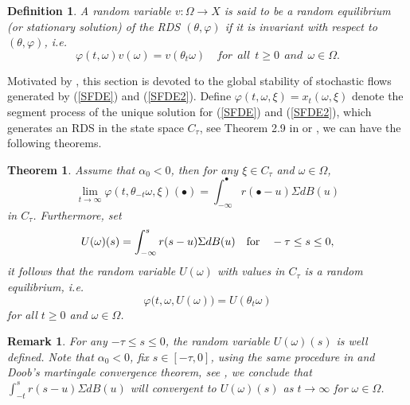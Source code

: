 \documentclass[preprint,12pt]{elsarticle}
\newtheorem{theorem}{Theorem}[section]
\newtheorem{definition}{Definition}[section]
\newtheorem{remark}{Remark}[section]
\begin{document}
\begin{definition}\label{Equili}
A random variable $v:\Omega\rightarrow X$ is said to be a random equilibrium (or stationary solution) of the RDS $(\theta,\varphi)$ if it is invariant with respect to  $(\theta,\varphi)$, i.e.
\[\varphi(t,\omega)v(\omega)=v(\theta_t\omega)\quad for\ \ all\ \ t\geq0\ \ and\ \ \omega\in\Omega.\]
\end{definition}

Motivated by \cite{JL1,JL3,KMen}, this section is devoted to the global stability of stochastic flows generated by (\ref{SFDE}) and (\ref{SFDE2}). Define $\varphi(t,\omega,\xi)=x_t(\omega,\xi)$ denote the segment process of the unique solution for (\ref{SFDE}) and (\ref{SFDE2}), which generates an RDS in the state space $C_\tau$, see Theorem 2.9 in \cite{BJX} or \cite{JL3}, we can have the following theorems.

\begin{theorem}\label{thm1} Assume that $\alpha_0<0$, then for any $\xi\in C_\tau$ and $\omega\in\Omega$,
\begin{equation}\label{Conclu1}
\lim_{t\rightarrow\infty}\varphi(t,\theta_{-t}\omega,\xi)(\bullet)=\int_{-\infty}^{\bullet}r(\bullet-u)\Sigma dB(u)
\end{equation}
in $C_\tau$. Furthermore, set
\begin{equation}\label{Conclu2}U(\omega)(s)=\int_{-\infty}^{s}r(s-u)\Sigma dB(u)\quad {\rm for}\quad-\tau\leq s\leq0,\end{equation}
it follows that the random variable $U(\omega)$ with values in $C_\tau$ is a random equilibrium, i.e.
\begin{equation}\label{Conclu3}\varphi\bigl(t,\omega,U(\omega)\bigr)=U(\theta_{t}\omega)\end{equation}
for all $t\geq0$ and $\omega\in\Omega$.
\end{theorem}

\begin{remark}
{\rm For any $-\tau\leq s\leq0$, the random variable $U(\omega)(s)$ is well defined. Note that $\alpha_0<0$, fix $s\in[-\tau,0]$, using the same procedure in \cite{JL1} and Doob's martingale convergence theorem, see {\rm \cite[Problem 3.20 in Chap. 1]{KS}},  we conclude that $\int_{-t}^{s}r(s-u)\Sigma dB(u)$ will convergent to $U(\omega)(s)$ as $t\rightarrow\infty$ for $\omega\in\Omega$.
}
\end{remark}
\end{document}
